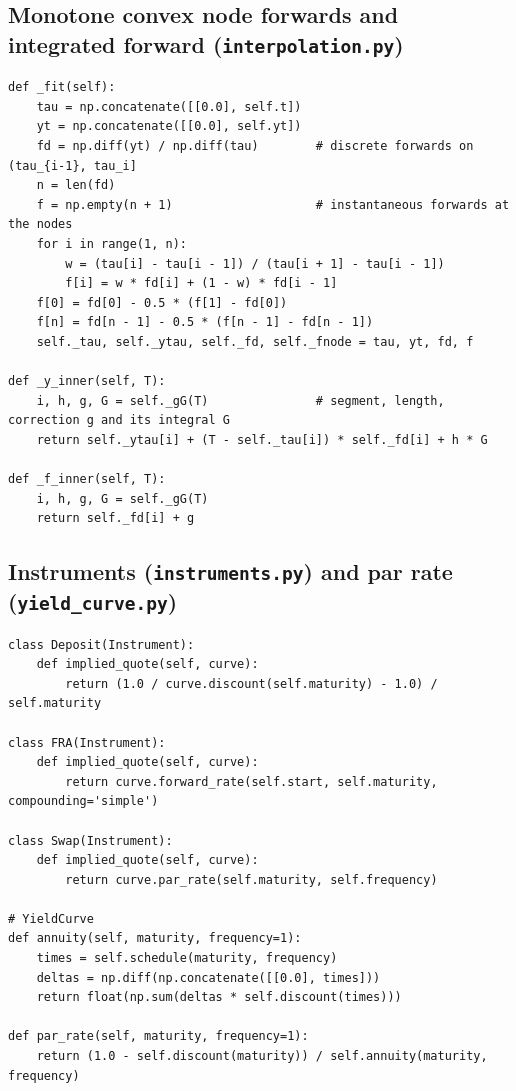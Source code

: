 \documentclass[11pt,a4paper]{article}
\theoremstyle{plain}
\theoremstyle{definition}
\begin{document}
\subsection{Monotone convex node forwards and integrated forward (\texttt{interpolation.py})}
\begin{lstlisting}[style=pystyle]
def _fit(self):
    tau = np.concatenate([[0.0], self.t])
    yt = np.concatenate([[0.0], self.yt])
    fd = np.diff(yt) / np.diff(tau)        # discrete forwards on (tau_{i-1}, tau_i]
    n = len(fd)
    f = np.empty(n + 1)                    # instantaneous forwards at the nodes
    for i in range(1, n):
        w = (tau[i] - tau[i - 1]) / (tau[i + 1] - tau[i - 1])
        f[i] = w * fd[i] + (1 - w) * fd[i - 1]
    f[0] = fd[0] - 0.5 * (f[1] - fd[0])
    f[n] = fd[n - 1] - 0.5 * (f[n - 1] - fd[n - 1])
    self._tau, self._ytau, self._fd, self._fnode = tau, yt, fd, f

def _y_inner(self, T):
    i, h, g, G = self._gG(T)               # segment, length, correction g and its integral G
    return self._ytau[i] + (T - self._tau[i]) * self._fd[i] + h * G

def _f_inner(self, T):
    i, h, g, G = self._gG(T)
    return self._fd[i] + g
\end{lstlisting}

\subsection{Instruments (\texttt{instruments.py}) and par rate (\texttt{yield\_curve.py})}
\begin{lstlisting}[style=pystyle]
class Deposit(Instrument):
    def implied_quote(self, curve):
        return (1.0 / curve.discount(self.maturity) - 1.0) / self.maturity

class FRA(Instrument):
    def implied_quote(self, curve):
        return curve.forward_rate(self.start, self.maturity, compounding='simple')

class Swap(Instrument):
    def implied_quote(self, curve):
        return curve.par_rate(self.maturity, self.frequency)

# YieldCurve
def annuity(self, maturity, frequency=1):
    times = self.schedule(maturity, frequency)
    deltas = np.diff(np.concatenate([[0.0], times]))
    return float(np.sum(deltas * self.discount(times)))

def par_rate(self, maturity, frequency=1):
    return (1.0 - self.discount(maturity)) / self.annuity(maturity, frequency)
\end{lstlisting}
\end{document}
